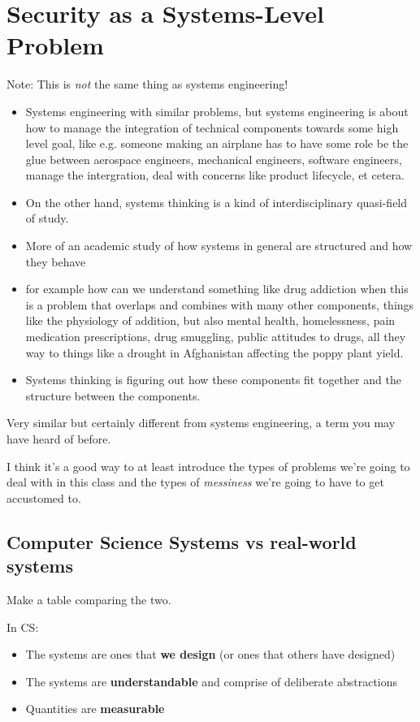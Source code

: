 \documentclass[11pt]{article}
\begin{document}
\section{Security as a Systems-Level Problem}

Note: This is {\it not} the same thing as systems engineering! 
\begin{itemize}
    \item Systems engineering with similar problems, but systems engineering is about how to manage the integration of technical components towards some high level goal, like e.g. someone making an airplane has to have some role be the glue between aerospace engineers, mechanical engineers, software engineers, manage the intergration, deal with concerns like product lifecycle, et cetera. 
    \item On the other hand, systems thinking is a kind of interdisciplinary quasi-field of study.
    \item More of an academic study of how systems in general are structured and how they behave
    \item for example how can we understand something like drug addiction when this is a problem that overlaps and combines with many other components, things like the physiology of addition, but also mental health, homelessness, pain medication prescriptions, drug smuggling, public attitudes to drugs, all they way to things like a drought in Afghanistan affecting the poppy plant yield.
    \item Systems thinking is figuring out how these components fit together and the structure between the components.
\end{itemize}

Very similar but certainly different from systems engineering, a term you may have heard of before. 

I think it's a good way to at least introduce the types of problems we're going to deal with in this class and the types of {\it messiness} we're going to have to get accustomed to. 

\subsection{Computer Science Systems vs real-world systems}

Make a table comparing the two.

In CS:
\begin{itemize}
    \item The systems are ones that {\bf we design} (or ones that others have designed)
    \item The systems are {\bf understandable} and comprise of deliberate abstractions
    \item Quantities are {\bf measurable}
\end{itemize}
\end{document}
